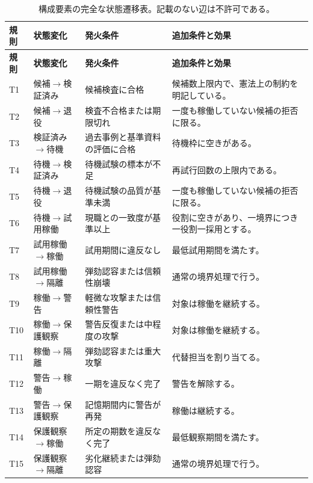 \small
\begin{longtable}{@{}p{}p{}p{}p{}@{}}
  \caption{構成要素の完全な状態遷移表。記載のない辺は不許可である。}
  \label{tab:component-transitions}\\
  \toprule
  \textbf{規則} & \textbf{状態変化} & \textbf{発火条件} & \textbf{追加条件と効果} \\
  \midrule
  \endfirsthead
  \toprule
  \textbf{規則} & \textbf{状態変化} & \textbf{発火条件} & \textbf{追加条件と効果} \\
  \midrule
  \endhead
  T1 & 候補$\rightarrow$検証済み & 候補検査に合格 &
    候補数上限内で、憲法上の制約を明記している。\\
  T2 & 候補$\rightarrow$退役 & 検査不合格または期限切れ &
    一度も稼働していない候補の拒否に限る。\\
  T3 & 検証済み$\rightarrow$待機 & 過去事例と基準資料の評価に合格 &
    待機枠に空きがある。\\
  T4 & 待機$\rightarrow$検証済み & 待機試験の標本が不足 &
    再試行回数の上限内である。\\
  T5 & 待機$\rightarrow$退役 & 待機試験の品質が基準未満 &
    一度も稼働していない候補の拒否に限る。\\
  T6 & 待機$\rightarrow$試用稼働 & 現職との一致度が基準以上 &
    役割に空きがあり、一境界につき一役割一採用とする。\\
  T7 & 試用稼働$\rightarrow$稼働 & 試用期間に違反なし &
    最低試用期間を満たす。\\
  T8 & 試用稼働$\rightarrow$隔離 & 弾劾認容または信頼性崩壊 &
    通常の境界処理で行う。\\
  T9 & 稼働$\rightarrow$警告 & 軽微な攻撃または信頼性警告 &
    対象は稼働を継続する。\\
  T10 & 稼働$\rightarrow$保護観察 & 警告反復または中程度の攻撃 &
    対象は稼働を継続する。\\
  T11 & 稼働$\rightarrow$隔離 & 弾劾認容または重大攻撃 &
    代替担当を割り当てる。\\
  T12 & 警告$\rightarrow$稼働 & 一期を違反なく完了 &
    警告を解除する。\\
  T13 & 警告$\rightarrow$保護観察 & 記憶期間内に警告が再発 &
    稼働は継続する。\\
  T14 & 保護観察$\rightarrow$稼働 & 所定の期数を違反なく完了 &
    最低観察期間を満たす。\\
  T15 & 保護観察$\rightarrow$隔離 & 劣化継続または弾劾認容 &
    通常の境界処理で行う。\\

\end{longtable}

